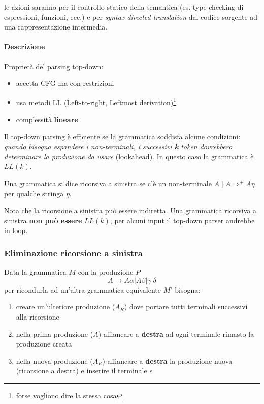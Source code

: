 le azioni saranno per il controllo statico della semantica (es. type
checking di espressioni, funzioni, ecc.) e per \textit{syntax-directed
translation} dal codice sorgente ad una rappresentazione intermedia.

\paragraph{Descrizione}
Propriet\`a del parsing top-down:
\begin{itemize}
\item accetta CFG ma con restrizioni
\item usa metodi LL (Left-to-right, Leftmost derivation)\footnote{forse vogliono
dire la stessa cosa}
\item complessit\`a \textbf{lineare}
\end{itemize}

Il top-down parsing \`e efficiente se la grammatica soddisfa alcune condizioni:
\textit{quando bisogna espandere i non-terminali, i successivi \textbf{k} token
dovrebbero determinare la produzione da usare} (lookahead). In questo caso la
grammatica \`e $LL(k)$.

\begin{definition}
Una grammatica si dice ricorsiva a sinistra se c'\`e un non-terminale $A
\mid A \Rightarrow^+ A\eta$ per qualche stringa $\eta$.
\end{definition}

Nota che la ricorsione a sinistra pu\`o essere indiretta. Una grammatica
ricorsiva a sinistra \textbf{non pu\`o essere} $LL(k)$, per alcuni input il
top-down parser andrebbe in loop.

\subsubsection{Eliminazione ricorsione a sinistra}
Data la grammatica $M$ con la produzione $P$
$$A \to A\alpha | A\beta |  \gamma | \delta$$
per ricondurla ad un'altra grammatica equivalente $M'$ bisogna:
\begin{enumerate}
\item creare un'ulteriore produzione ($A_R$) dove portare tutti terminali
successivi alla ricorsione
\item nella prima produzione ($A$) affiancare a \textbf{destra} ad ogni
terminale rimasto la produzione creata
\item nella nuova produzione ($A_R$) affiancare a \textbf{destra} la produzione
nuova (ricorsione a destra) e inserire il terminale $\epsilon$
\end{enumerate}

